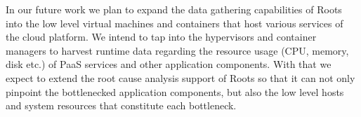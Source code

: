 In our future work we plan to expand the data gathering capabilities of Roots into
the low level virtual machines and containers that host various services of the cloud
platform. We intend to tap into the hypervisors
and container managers to harvest runtime data regarding the resource usage (CPU, memory, disk etc.) of
PaaS services and other application components. With that we expect to extend
the root cause analysis support of Roots so that it can not only pinpoint the
bottlenecked application components, but also the low level hosts and system
resources that constitute each bottleneck.